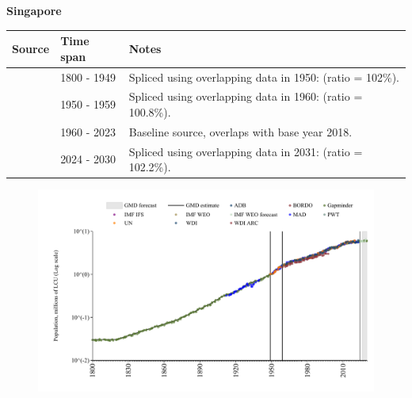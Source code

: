 \documentclass[12pt,a4paper,landscape]{article}
\begin{document}
\begin{adjustbox}{max totalsize={\paperwidth}{\paperheight},center}
\begin{minipage}[t][\textheight][t]{\textwidth}
\vspace*{0.5cm}
{}
\begin{center}
{\Large\bfseries Singapore}
\end{center}
\vspace{0.5cm}
\begin{table}[H]
\centering
\small
\begin{tabular}{|l|l|l|}
\hline
\textbf{Source} & \textbf{Time span} & \textbf{Notes} \\
\hline
\rowcolor{white}\cite{Gapminder}& 1800 - 1949 &Spliced using overlapping data in 1950: (ratio = 102\%).\\
\rowcolor{lightgray}\cite{IMF_IFS}& 1950 - 1959 &Spliced using overlapping data in 1960: (ratio = 100.8\%).\\
\rowcolor{white}\cite{WDI}& 1960 - 2023 &Baseline source, overlaps with base year 2018.\\
\rowcolor{lightgray}\cite{Gapminder}& 2024 - 2030 &Spliced using overlapping data in 2031: (ratio = 102.2\%).\\
\hline
\end{tabular}
\end{table}
\begin{figure}[H]
\centering
\includegraphics[width=\textwidth,height=0.6\textheight,keepaspectratio]{graphs/SGP_pop.pdf}
\end{figure}
\end{minipage}
\end{adjustbox}
\end{document}
